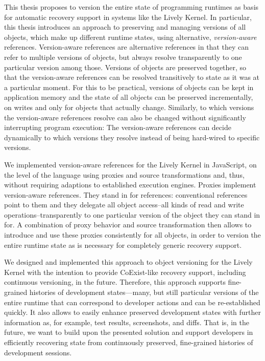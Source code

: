 This thesis proposes to version the entire state of programming runtimes as basis for automatic recovery support in systems like the Lively Kernel.
In particular, this thesis introduces an approach to preserving and managing versions of all objects, which make up different runtime states, using alternative, \emph{version-aware} references.
Version-aware references are alternative references in that they can refer to multiple versions of objects, but always resolve transparently to one particular version among those.
Versions of objects are preserved together, so that the version-aware references can be resolved transitively to state as it was at a particular moment.
For this to be practical, versions of objects can be kept in application memory and the state of all objects can be preserved incrementally, on writes and only for objects that actually change.
Similarly, to which versions the version-aware references resolve can also be changed without significantly interrupting program execution:
The version-aware references can decide dynamically to which versions they resolve instead of being hard-wired to specific versions.

We implemented version-aware references for the Lively Kernel in JavaScript, on the level of the language using proxies and source transformations and, thus, without requiring adaptions to established execution engines.
Proxies implement version-aware references.
They stand in for references: conventional references point to them and they delegate all object access--all kinds of read and write operations--transparently to one particular version of the object they can stand in for.
A combination of proxy behavior and source transformation then allows to introduce and use these proxies consistently for all objects, in order to version the entire runtime state as is necessary for completely generic recovery support.

We designed and implemented this approach to object versioning for the Lively Kernel with the intention to provide CoExist-like recovery support, including continuous versioning, in the future.
Therefore, this approach supports fine-grained histories of development states---many, but still particular versions of the entire runtime that can correspond to developer actions and can be re-established quickly.
It also allows to easily enhance preserved development states with further information as, for example, test results, screenshots, and diffs.
That is, in the future, we want to build upon the presented solution and support developers in efficiently recovering state from continuously preserved, fine-grained histories of development sessions.


